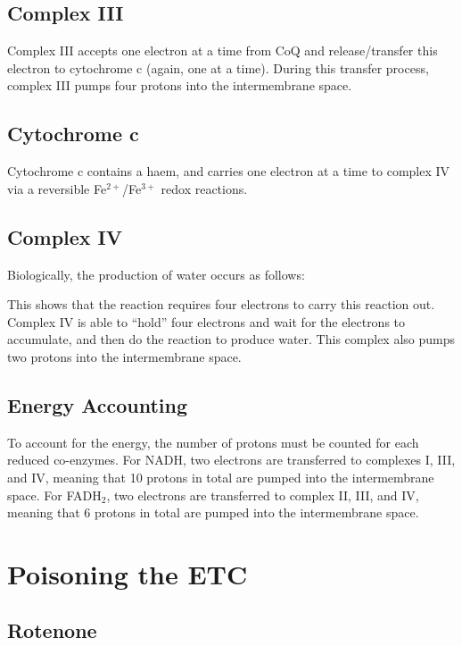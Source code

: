 \subsection{Complex III}

Complex III accepts one electron at a time from CoQ and release/transfer this electron to cytochrome c (again, one at a time).
During this transfer process, complex III pumps four protons into the intermembrane space.

\subsection{Cytochrome c}

Cytochrome c contains a haem, and carries one electron at a time to complex IV via a reversible Fe$^{2+}$/Fe$^{3+}$ redox reactions.

\subsection{Complex IV}

Biologically, the production of water occurs as follows:

\begin{center}
\end{center}

This shows that the reaction requires four electrons to carry this reaction out.
Complex IV is able to ``hold'' four electrons and wait for the electrons to accumulate, and then do the reaction to produce water.
This complex also pumps two protons into the intermembrane space.

\subsection{Energy Accounting}

To account for the energy, the number of protons must be counted for each reduced co-enzymes.
For NADH, two electrons are transferred to complexes I, III, and IV, meaning that 10 protons in total are pumped into the intermembrane space.
For FADH$_2$, two electrons are transferred to complex II, III, and IV, meaning that 6 protons in total are pumped into the intermembrane space.

\section{Poisoning the ETC}

\subsection{Rotenone}

